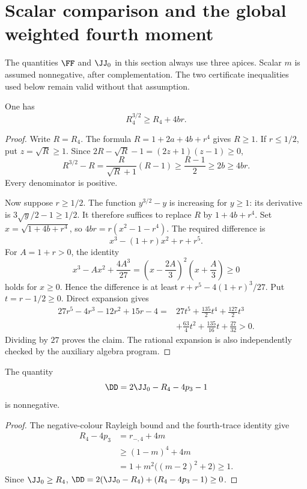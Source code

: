 \section{Scalar comparison and the global weighted fourth moment}
\label{sec:weighted}

The quantities $\FF$ and $\JJ_0$ in this section always use three apices.  Scalar $m$ is
assumed nonnegative, after complementation.  The two certificate inequalities used below
remain valid without that assumption.

\begin{lemma}
\label{lem:amplification}
\proved One has
\[
 R_4^{3/2}\ge R_4+4br.
\]
\end{lemma}
\begin{proof}
Write $R=R_4$.  The formula $R=1+2a+4b+r^4$ gives $R\ge1$.
If $r\le1/2$, put $z=\sqrt R\ge1$.  Since
$2R-\sqrt R-1=(2z+1)(z-1)\ge0$,
\[
 R^{3/2}-R
 =\frac{R}{\sqrt R+1}(R-1)
 \ge\frac{R-1}{2}\ge2b\ge4br.
\]
Every denominator is positive.

Now suppose $r\ge1/2$.  The function $y^{3/2}-y$ is increasing for $y\ge1$: its derivative
is $3\sqrt y/2-1\ge1/2$.  It therefore suffices to replace $R$ by
$1+4b+r^4$.  Set $x=\sqrt{1+4b+r^4}$, so
$4br=r(x^2-1-r^4)$.  The required difference is
\[
 x^3-(1+r)x^2+r+r^5.
\]
For $A=1+r>0$, the identity
\[
 x^3-Ax^2+\frac{4A^3}{27}
 =\left(x-\frac{2A}{3}\right)^2\left(x+\frac A3\right)\ge0
\]
holds for $x\ge0$.  Hence the difference is at least
$r+r^5-4(1+r)^3/27$.  Put $t=r-1/2\ge0$.  Direct expansion gives
\begin{align*}
 27r^5-4r^3-12r^2+15r-4
 ={}&27t^5+\frac{135}{2}t^4+\frac{127}{2}t^3\\
 &+\frac{63}{4}t^2+\frac{135}{16}t+\frac{27}{32}>0.
\end{align*}
Dividing by $27$ proves the claim.  The rational expansion is also independently checked
by the auxiliary algebra program.
\end{proof}

\begin{lemma}
\label{lem:auxiliary-D}
\proved The quantity
\[
 \DD=2\JJ_0-R_4-4p_3-1
\]
is nonnegative.
\end{lemma}
\begin{proof}
The negative-colour Rayleigh bound and the fourth-trace identity give
\begin{align*}
 R_4-4p_3
 &=r_{-,4}+4m\\
 &\ge(1-m)^4+4m\\
 &=1+m^2\bigl((m-2)^2+2\bigr)\ge1.
\end{align*}
Since $\JJ_0\ge R_4$,
$\DD=2(\JJ_0-R_4)+(R_4-4p_3-1)\ge0$.
\end{proof}


